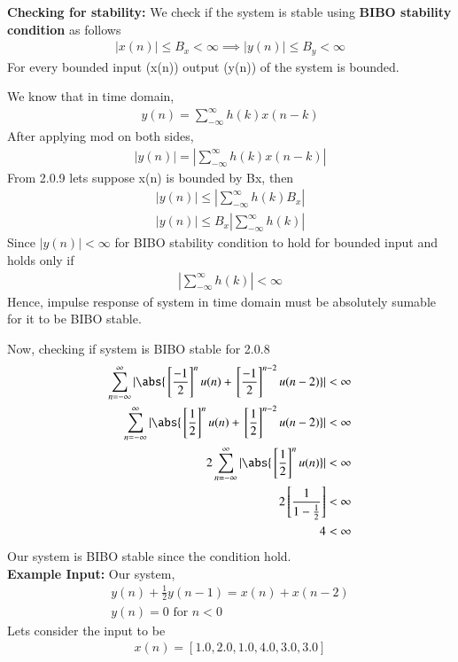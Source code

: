 \documentclass[journal,12pt,twocolumn]{IEEEtran}
\begin{document}
\textbf {Checking for stability:}
We check if the system is stable using \textbf{BIBO stability condition} as follows
\begin{align}
    |x(n)|\leq B_x<\infty \implies |y(n)| \leq B_y<\infty
\end{align}
For every bounded input (x(n)) output (y(n)) of the system is bounded.

We know that in time domain, 
\begin{align}
    y(n)=\sum_{-\infty}^{\infty}h(k)x(n-k)
\end{align}
After applying mod on both sides,
\begin{align}
    |y(n)|=|\sum_{-\infty}^{\infty}h(k)x(n-k)|
\end{align}
From 2.0.9 lets suppose x(n) is bounded by Bx, then
\begin{align}
      |y(n)| \leq |\sum_{-\infty}^{\infty}h(k) B_x|\\
    |y(n)| \leq B_x|\sum_{-\infty}^{\infty}h(k)|
\end{align}
Since $|y(n)| < \infty$ for BIBO stability condition to hold for bounded input and holds only if
\begin{align}
    |\sum_{-\infty}^{\infty}h(k)| < \infty
\end{align}
Hence, impulse response of system in time domain must be absolutely sumable for it to be BIBO stable.

Now, checking if system is BIBO stable for 2.0.8\
\begin{align}
    \sum_{n=-\infty}^{\infty}|\abs{\sbrak{\frac{-1}{2}}^nu(n) + \sbrak{\frac{-1}{2}}^{n-2}u(n-2)}| < \infty \\
     \sum_{n=-\infty}^{\infty}|\abs{\sbrak{\frac{1}{2}}^nu(n) + \sbrak{\frac{1}{2}}^{n-2}u(n-2)}| < \infty \\
     2\sum_{n=-\infty}^{\infty}|\abs{\sbrak{\frac{1}{2}}^nu(n)}| < \infty \\
     2\sbrak{\frac{1}{1-\frac{1}{2}}} < \infty \\
    4 < \infty
\end{align}
Our system is BIBO stable since the condition hold.\\

\textbf{Example Input:}
Our system,
\begin{align}
    y(n)+\frac{1}{2}y(n-1) = x(n)+x(n-2) \\
    y(n)=0 \text{ for }n<0
\end{align}
Lets consider the input to be
\begin{align}
    x(n)= [1.0,2.0,1.0,4.0,3.0,3.0]
\end{align}
\end{document}
